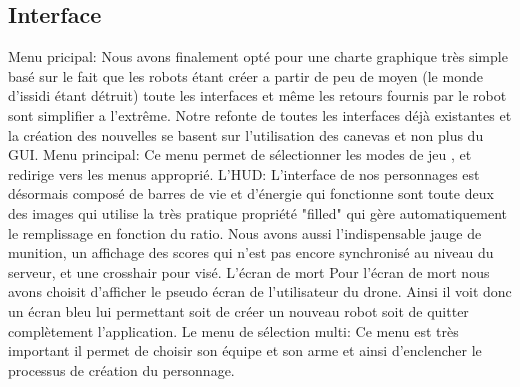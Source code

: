 ﻿\documentclass[12pt]{article}
\begin{document}
\subsection{Interface}
Menu pricipal:
\newline Nous avons finalement opté pour une charte graphique très simple basé sur le fait que les robots étant créer a partir de peu de moyen (le monde d'issidi étant détruit) toute les interfaces et même les retours fournis par le robot sont simplifier a l'extrême. Notre refonte de toutes les interfaces déjà existantes et la création des nouvelles se basent sur l'utilisation des canevas et non plus du GUI.
\newline\newline Menu principal:
\newline Ce menu permet de sélectionner les modes de jeu , et redirige vers les menus approprié.
\newline\newline  L'HUD:  
\newline L'interface de nos personnages est désormais composé de barres de vie et d'énergie qui fonctionne sont toute deux des images qui utilise la très pratique propriété "filled" qui gère automatiquement le remplissage en fonction du ratio. Nous avons aussi l'indispensable jauge de munition, un affichage des scores qui n'est pas encore synchronisé au niveau du serveur, et une crosshair pour visé.
\newline L'écran de mort
\newline Pour l'écran de mort nous avons choisit d'afficher le pseudo écran de l'utilisateur du drone. Ainsi il voit donc un écran bleu lui permettant soit de créer un nouveau robot soit de quitter complètement l'application.
\newline\newline Le menu de sélection multi:  
\newline Ce menu est très important il permet de choisir son équipe et son arme et ainsi d'enclencher le processus de création du personnage.
 
\end{document}
